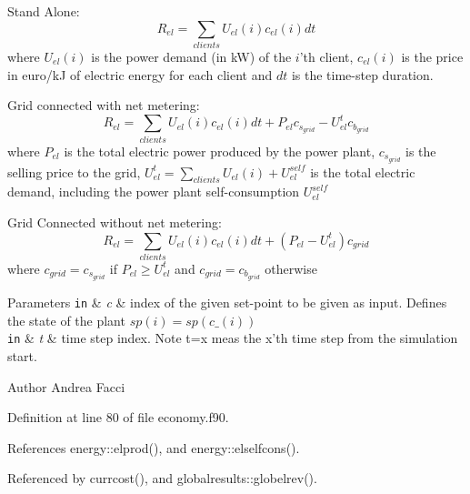 \begin{DoxyItemize}
\item Stand Alone\-: \[ R_{el} = \sum_{clients} U_{el}(i)c_{el}(i)dt \] where $ U_{el}(i)$ is the power demand (in k\-W) of the $i$'th client, $c_{el}(i)$ is the price in euro/k\-J of electric energy for each client and $ dt$ is the time-\/step duration.\par

\item Grid connected with net metering\-: \[ R_{el} = \sum_{clients} U_{el}(i)c_{el}(i)dt + P_{el}c_{s_{grid}} - U_{el}^{t}c_{b_{grid}} \] where $P_{el}$ is the total electric power produced by the power plant, $c_{s_{grid}}$ is the selling price to the grid, $U_{el}^{t} = \sum_{clients} U_{el}(i) + U_{el}^{self} $ is the total electric demand, including the power plant self-\/consumption $U_{el}^{self}$\par

\item Grid Connected without net metering\-: \[ R_{el} = \sum_{clients} U_{el}(i)c_{el}(i)dt + (P_{el} - U_{el}^{t}) c_{grid} \] where $ c_{grid} = c_{s_{grid}}$ if $P_{el} \ge U_{el}^{t}$ and $ c_{grid} = c_{b_{grid}}$ otherwise 
\begin{DoxyParams}[1]{Parameters}
\mbox{\tt in}  & {\em c} & index of the given set-\/point to be given as input. Defines the state of the plant $sp(i) = sp(c\_(i))$ \\
\hline
\mbox{\tt in}  & {\em t} & time step index. Note t=x meas the x'th time step from the simulation start. \\
\hline
\end{DoxyParams}
\begin{DoxyAuthor}{Author}
Andrea Facci 
\end{DoxyAuthor}

\end{DoxyItemize}

Definition at line 80 of file economy.\-f90.



References energy\-::elprod(), and energy\-::elselfcons().



Referenced by currcost(), and globalresults\-::globelrev().

